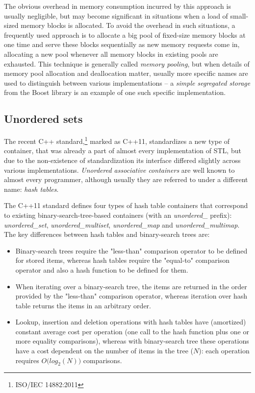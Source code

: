 The obvious overhead in memory consumption incurred by this approach is usually negligible,
but may become significant in situations when a load of small-sized memory blocks is allocated.
To avoid the overhead in such situations, a frequently used approach is to allocate a big pool of
fixed-size memory blocks at one time and serve these blocks sequentially as new memory requests
come in, allocating a new pool whenever all memory blocks in existing pools are exhausted.
This technique is generally called \emph{memory pooling}, but when details of
memory pool allocation and deallocation matter, usually more specific names are used to
distinguish between various implementations --  a \emph{simple segregated storage} from the Boost
library is an example of one such specific
implementation.


\subsection{Unordered sets}

The recent C++ standard,\footnote{ISO/IEC 14882:2011} marked as C++11, standardizes
a new type of container, that was already a part of almost every implementation of STL,
but due to the non-existence of standardization its interface differed slightly across
various implementations.
\emph{Unordered associative containers} are well known to almost every programmer,
although usually they are referred to under a different name: \emph{hash tables}.

The C++11 standard defines four types of hash table containers that correspond to existing
binary-search-tree-based containers (with an \emph{unordered_} prefix):
\emph{unordered_set}, \emph{unordered_multiset}, \emph{unordered_map} and \emph{unordered_multimap}.
The key differences between hash tables and binary-search trees are:
\begin{itemize}
  \item Binary-search trees require the "less-than" comparison operator to be defined for stored items,
  whereas hash tables require the "equal-to" comparison operator and also a hash function to be
  defined for them.
  \item When iterating over a binary-search tree, the items are returned in the order provided by
  the "less-than" comparison operator, whereas iteration over hash table returns the items in an arbitrary
  order.
  \item Lookup, insertion and deletion operations with hash tables have (amortized) constant
  average cost per operation (one call to the hash function plus one or more equality comparisons),
  whereas with binary-search tree these operations have a cost dependent on the number of items
  in the tree ($N$): each operation requires $O\big(log_2(N)\big)$ comparisons.
\end{itemize}

